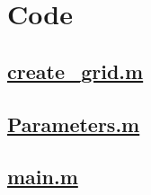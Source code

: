\documentclass{article}
\begin{document}
\clearpage

\lstset{language=MATLAB}


\section*{Code}
\subsection*{\underline{create\_grid.m}}
\begin{adjustwidth}{0.2in}{0in}

\end{adjustwidth}

\subsection*{\underline{Parameters.m}}
\begin{adjustwidth}{0.2in}{0in}

\end{adjustwidth}

\subsection*{\underline{main.m}}
\begin{adjustwidth}{0.2in}{0in}

\end{adjustwidth}
\end{document}
